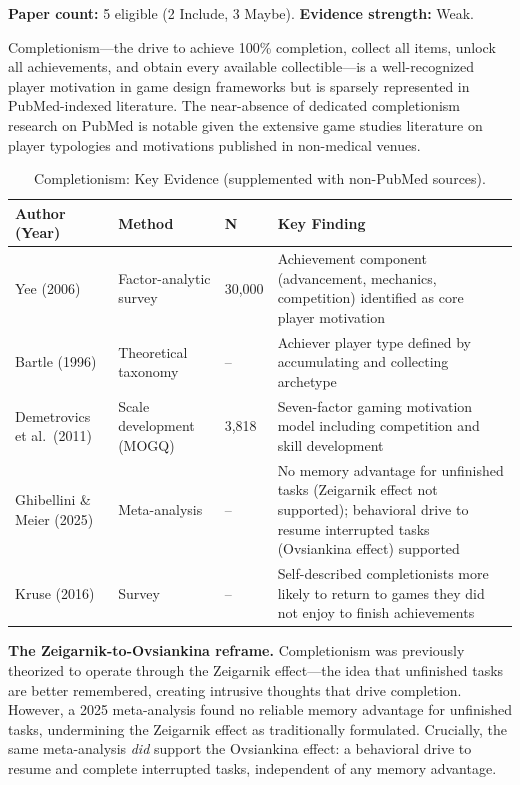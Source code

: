 \documentclass[12pt]{article}
\begin{document}
\textbf{Paper count:} 5 eligible (2 Include, 3 Maybe). \textbf{Evidence strength:} Weak.

Completionism---the drive to achieve 100\% completion, collect all items, unlock all achievements, and obtain every available collectible---is a well-recognized player motivation in game design frameworks \citep{Bartle1996, Yee2006} but is sparsely represented in PubMed-indexed literature. The near-absence of dedicated completionism research on PubMed is notable given the extensive game studies literature on player typologies and motivations published in non-medical venues.

\begin{table}[ht]
\centering
\caption{Completionism: Key Evidence (supplemented with non-PubMed sources).}
\small
\begin{tabular}{p{3.2cm}p{3cm}p{1.5cm}p{6cm}}
\toprule
Author (Year) & Method & N & Key Finding \\
\midrule
Yee (2006) & Factor-analytic survey & 30,000 & Achievement component (advancement, mechanics, competition) identified as core player motivation \\
Bartle (1996) & Theoretical taxonomy & -- & Achiever player type defined by accumulating and collecting archetype \\
Demetrovics et al.\ (2011) & Scale development (MOGQ) & 3,818 & Seven-factor gaming motivation model including competition and skill development \\
Ghibellini \& Meier (2025) & Meta-analysis & -- & No memory advantage for unfinished tasks (Zeigarnik effect not supported); behavioral drive to resume interrupted tasks (Ovsiankina effect) supported \\
Kruse (2016) & Survey & -- & Self-described completionists more likely to return to games they did not enjoy to finish achievements \\
\bottomrule
\end{tabular}
\end{table}

\textbf{The Zeigarnik-to-Ovsiankina reframe.} Completionism was previously theorized to operate through the Zeigarnik effect---the idea that unfinished tasks are better remembered, creating intrusive thoughts that drive completion. However, a 2025 meta-analysis \citep{Ghibellini2025} found no reliable memory advantage for unfinished tasks, undermining the Zeigarnik effect as traditionally formulated. Crucially, the same meta-analysis \textit{did} support the Ovsiankina effect: a behavioral drive to resume and complete interrupted tasks, independent of any memory advantage.
\end{document}
